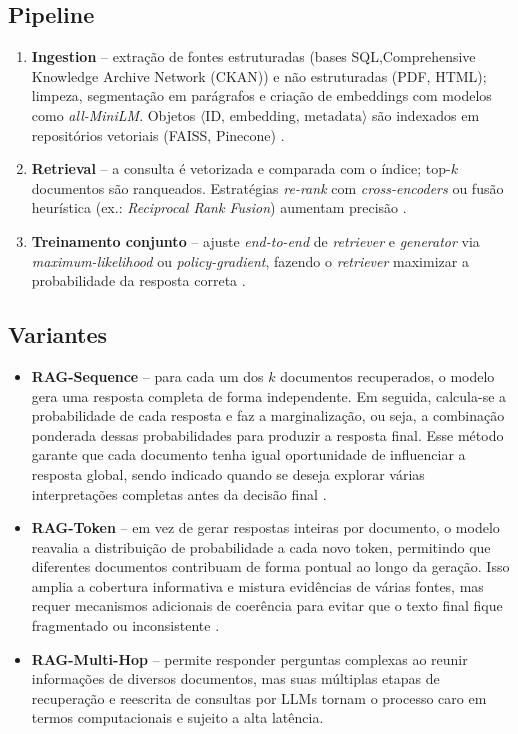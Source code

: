 \begin{description}
\subsection{Pipeline}
\label{sec:rag:pipeline}
\begin{enumerate}[label=\arabic*.]
  \item \textbf{Ingestion} – extração de fontes estruturadas (bases SQL,Comprehensive Knowledge Archive Network (CKAN))
        e não estruturadas (PDF, HTML); limpeza, segmentação em parágrafos e
        criação de embeddings com modelos como \textit{all-MiniLM}.
        Objetos $\langle\text{ID},\,\text{embedding},\,\text{metadata}\rangle$
        são indexados em repositórios vetoriais (FAISS, Pinecone)
        \cite{qwak2024integrating,taipalus2024vector}.
  \item \textbf{Retrieval} – a consulta é vetorizada e comparada com o índice;
        top-$k$ documentos são ranqueados. Estratégias \emph{re-rank} com
        \textit{cross-encoders} ou fusão heurística (ex.: \textit{Reciprocal
        Rank Fusion}) aumentam precisão \cite{edwards2024hybrid}.
  \item \textbf{Treinamento conjunto} – ajuste \textit{end-to-end} de
        \textit{retriever} e \textit{generator} via
        \textit{maximum-likelihood} ou \textit{policy-gradient}, fazendo o
        \textit{retriever} maximizar a probabilidade da resposta correta
        \cite{zhang2025fine}.
\end{enumerate}

\subsection{Variantes}
\begin{itemize}
  \item \textbf{RAG-Sequence} – para cada um dos $k$ documentos recuperados, o modelo gera uma resposta completa de forma independente. Em seguida, calcula-se a probabilidade de cada resposta e faz a marginalização, ou seja, a combinação ponderada dessas probabilidades para produzir a resposta final. Esse método garante que cada documento tenha igual oportunidade de influenciar a resposta global, sendo indicado quando se deseja explorar várias interpretações completas antes da decisão final \cite{lewis2020rag,edwards2024hybrid}.
  \item \textbf{RAG-Token} – em vez de gerar respostas inteiras por documento, o modelo reavalia a distribuição de probabilidade a cada novo token, permitindo que diferentes documentos contribuam de forma pontual ao longo da geração. Isso amplia a cobertura informativa e mistura evidências de várias fontes, mas requer mecanismos adicionais de coerência para evitar que o texto final fique fragmentado ou inconsistente \cite{zhang2025fine}.
  \item \textbf{RAG-Multi-Hop} – permite responder perguntas complexas ao reunir informações de diversos documentos, mas suas múltiplas etapas de recuperação e reescrita de consultas por LLMs tornam o processo caro em termos computacionais e sujeito a alta latência. \cite{li2025treehopgeneratefilterquery}
\end{itemize}


\end{description}
